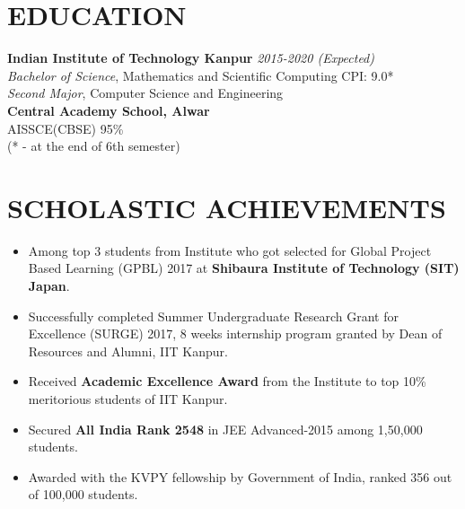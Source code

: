 \documentclass[margin]{res}
\begin{document}
\begin{resume}

\section{EDUCATION}
\textbf{Indian Institute of Technology Kanpur} \hfill \textit{2015-2020 (Expected)}\\
{\sl Bachelor of Science}, Mathematics and Scientific Computing \hfill CPI: 
9.0*
\\
{\sl Second Major}, Computer Science and Engineering \\
\textbf{Central Academy School, Alwar}\\
AISSCE(CBSE) \hfill 95\% \\
{\small (* -  at the end of 6th semester)}
\section{SCHOLASTIC ACHIEVEMENTS}
\begin{itemize}
\item Among top 3 students from Institute who got selected for Global Project Based Learning (GPBL) 2017 at
\textbf{Shibaura Institute of Technology (SIT) Japan}.
\item Successfully completed Summer Undergraduate Research Grant for Excellence (SURGE) 2017, 8 weeks internship program granted by Dean of Resources and Alumni, IIT Kanpur.
\item Received \textbf{Academic Excellence Award}  from the Institute to top 10\% meritorious students of IIT Kanpur.
\item Secured \textbf{All India Rank 2548} in JEE Advanced-2015 among 1,50,000 students.
\item Awarded with the KVPY fellowship by Government of India, ranked 356 out of 100,000 students.
\end{itemize}


\end{resume}
\end{document}
